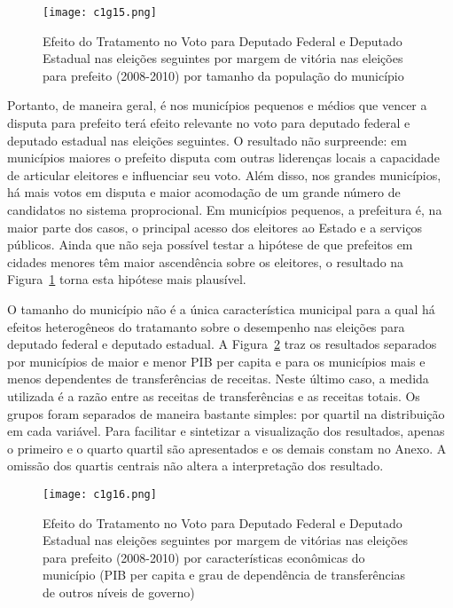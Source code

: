 \begin{figure}[htp]
	\centering
	\texttt{[image: c1g15.png]}
	\caption{Efeito do Tratamento no Voto para Deputado Federal e Deputado Estadual nas eleições seguintes por margem de vitória nas eleições para prefeito (2008-2010) por tamanho da população do município}
	\label{fig:c1g15} 
\end{figure}

Portanto, de maneira geral, é nos municípios pequenos e médios que vencer a disputa para prefeito terá efeito relevante no voto para deputado federal e deputado estadual nas eleições seguintes. O resultado não surpreende: em municípios maiores o prefeito disputa com outras liderenças locais a capacidade de articular eleitores e influenciar seu voto. Além disso, nos grandes municípios, há mais votos em disputa e maior acomodação de um grande número de candidatos no sistema proprocional. Em municípios pequenos, a prefeitura é, na maior parte dos casos, o principal acesso dos eleitores ao Estado e a serviços públicos. Ainda que não seja possível testar a hipótese de que prefeitos em cidades menores têm maior ascendência sobre os eleitores, o resultado na Figura~\ref{fig:c1g15} torna esta hipótese mais plausível.

O tamanho do município não é a única característica municipal para a qual há efeitos heterogêneos do tratamanto sobre o desempenho nas eleições para deputado federal e deputado estadual. A Figura~\ref{fig:c1g16} traz os resultados separados por municípios de maior e menor PIB per capita e para os municípios mais e menos dependentes de transferências de receitas. Neste último caso, a medida utilizada é a razão entre as receitas de transferências e as receitas totais. Os grupos foram separados de maneira bastante simples: por quartil na distribuição em cada variável. Para facilitar e sintetizar a visualização dos resultados, apenas o primeiro e o quarto quartil são apresentados e os demais constam no Anexo. A omissão dos quartis centrais não altera a interpretação dos resultado.

\begin{figure}[htp]
	\centering
	\texttt{[image: c1g16.png]}
	\caption{Efeito do Tratamento no Voto para Deputado Federal e Deputado Estadual nas eleições seguintes por margem de vitórias nas eleições para prefeito (2008-2010) por características econômicas do município (PIB per capita e grau de dependência de transferências de outros níveis de governo)}
	\label{fig:c1g16} 
\end{figure}

